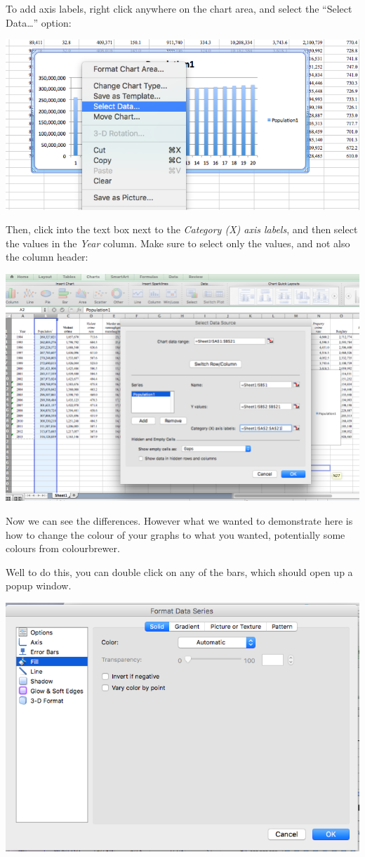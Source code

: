 \documentclass[]{book}
\theoremstyle{definition}
\theoremstyle{definition}
\theoremstyle{definition}
\theoremstyle{remark}
\begin{document}
To add axis labels, right click anywhere on the chart area, and select
the ``Select Data\ldots{}'' option:

\includegraphics{imgs/pb2.png}

Then, click into the text box next to the \emph{Category (X) axis
labels}, and then select the values in the \emph{Year} column. Make sure
to select only the values, and not also the column header:

\includegraphics{imgs/pb3.png}

Now we can see the differences. However what we wanted to demonstrate
here is how to change the colour of your graphs to what you wanted,
potentially some colours from colourbrewer.

Well to do this, you can double click on any of the bars, which should
open up a popup window.

\includegraphics{imgs/manual_fill_1.png}
\end{document}
